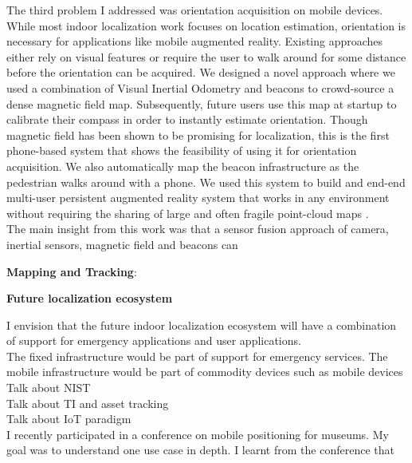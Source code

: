 \documentclass[10pt]{article}
\begin{document}
The third problem I addressed was orientation acquisition on mobile devices. While most indoor localization work focuses on location estimation, orientation is necessary for applications like mobile augmented reality. Existing approaches either rely on visual features or require the user to walk around for some distance before the orientation can be acquired. %
We designed a novel approach where we used a combination of Visual Inertial Odometry and beacons to crowd-source a dense magnetic field map. Subsequently, future users use this map at startup to calibrate their compass in order to instantly estimate orientation. Though magnetic field has been shown to be promising for localization, this is the first phone-based system that shows the feasibility of using it for orientation acquisition. We also automatically map the beacon infrastructure as the pedestrian walks around with a phone.  We used this system to build and end-end multi-user persistent augmented reality system that works in any environment without requiring the sharing of large and often fragile point-cloud maps \cite{rajagopal2018welcome}. \\

The main insight from this work was that a sensor fusion approach of camera, inertial sensors, magnetic field and beacons can 

\textbf{Mapping and Tracking}:

\textbf{Future localization ecosystem}

I envision that the future indoor localization ecosystem will have a combination of support for emergency applications and user applications. \\%
The fixed infrastructure would be part of support for emergency services. The mobile infrastructure would be part of commodity devices such as mobile devices\\
Talk about NIST\\
Talk about TI and asset tracking\\
Talk about IoT paradigm\\
I recently participated in a conference on mobile positioning for museums. My goal was to understand one use case in depth. I learnt from the conference that 
\end{document}

